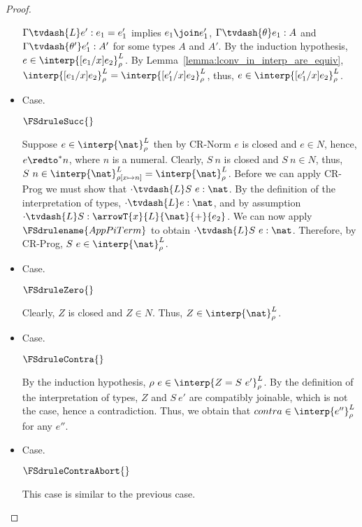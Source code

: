 \begin{proof}
\begin{itemize}
\begin{center}
    \end{center}
    $\Gamma \tvdash{L} e':e_1 = e'_1$ implies $e_1 \join e'_1$, $\Gamma
    \tvdash{\theta} e_1:A$ and $\Gamma \tvdash{\theta'} e'_1:A'$ for
    some types $A$ and $A'$.  By the induction hypothesis, $e \in
    \interp{[e_1/x]e_2}^L_\rho$.  By  
    Lemma~\ref{lemma:lconv_in_interp_are_equiv},
    $\interp{[e_1/x]e_2}^L_\rho = \interp{[e'_1/x]e_2}^L_\rho$,
    thus, $e \in \interp{[e'_1/x]e_2}^L_\rho$.
  
  \item[]Case.\ \\
    \begin{center}
      $\FSdruleSucc{}$
    \end{center}
    Suppose $e \in \interp{\nat}^L_\rho$ then by CR-Norm $e$ is closed
    and $e \in N$, hence, $e \redto^* n$, where $n$ is a numeral.
    Clearly, $S\ n$ is closed and $S\ n \in N$, thus, $S\ n \in
    \interp{\nat}^L_{\rho[x \mapsto n]} = \interp{\nat}^L_\rho$.  
    Before we can apply CR-Prog we must show that $\cdot \tvdash{L} S\ e:\nat$.
    By the definition of the interpretation of types, $\cdot \tvdash{L} e:\nat$,
    and by assumption $\cdot \tvdash{L} S:\arrowT{x}{L}{\nat}{+}{e_2}$.  We can
    now apply $\FSdrulename{AppPiTerm}$ to obtain $\cdot \tvdash{L} S\ e:\nat$.
    Therefore, by CR-Prog, $S\ e \in \interp{\nat}^L_\rho$.
  
  \item[]Case.\ \\
    \begin{center}
      $\FSdruleZero{}$
    \end{center}
    Clearly, $Z$ is closed and $Z \in N$.  Thus, $Z \in
    \interp{\nat}^L_\rho$.

  \item[]Case.\ \\
    \begin{center}
      $\FSdruleContra{}$
    \end{center}
    By the induction hypothesis, $\rho\ e \in \interp{Z =
    S\ e'}^L_\rho$.  By the
    definition of the interpretation of types, $Z$ and $S\ e'$ are
    compatibly joinable, which is not the case, hence a
    contradiction.  Thus, we obtain that $contra \in
    \interp{e''}^L_\rho$ for any $e''$.
    
  \item[]Case.\ \\
    \begin{center}
      $\FSdruleContraAbort{}$
    \end{center}
    This case is similar to the previous case.


\end{itemize}
\end{proof}
